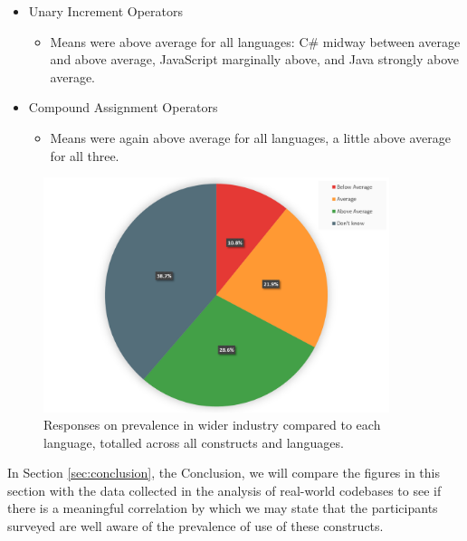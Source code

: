 \documentclass{article}
\begin{document}
\begin{itemize}
\begin{itemize}
                \end{itemize}
                \item Unary Increment Operators
                \begin{itemize}
                    \item Means were above average for all languages: C\# midway between average and above average, JavaScript marginally above, and Java strongly above average.                
                \end{itemize}
                \item Compound Assignment Operators
                \begin{itemize}
                    \item Means were again above average for all languages, a little above average for all three.  
                \end{itemize}
            \end{itemize}

            \begin{figure}[htbp]
                \centering
                \includegraphics[width=0.9\textwidth]{industryPie.png}
                \caption{Responses on prevalence in wider industry compared to each language, totalled across all constructs and languages.}
                \label{fig:indsutryPie}
            \end{figure}

            In Section \ref{sec:conclusion}, the Conclusion, we will compare the figures in this section with the data collected in the analysis of real-world codebases to see if there is a meaningful correlation by which we may state that the participants surveyed are well aware of the prevalence of use of these constructs.
\end{document}
